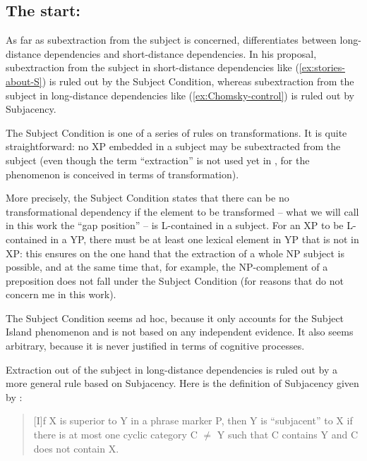 \subsection{The start: \citet{Chomsky.1973}}

As far as subextraction from the subject is concerned, \citet{Chomsky.1973} differentiates between long-distance dependencies and short-distance dependencies. In his proposal, subextraction from the subject in short-distance dependencies like (\ref{ex:stories-about-S}) is ruled out by the Subject Condition, whereas subextraction from the subject in long-distance dependencies like (\ref{ex:Chomsky-control}) is ruled out by Subjacency. 

The Subject Condition is one of a series of rules on transformations. It is quite straightforward: no XP embedded in a subject may be subextracted from the subject (even though the term ``extraction'' is not used yet in \citet{Chomsky.1973}, for the phenomenon is conceived in terms of transformation). 

More precisely, the Subject Condition states that there can be no transformational dependency if the element to be transformed -- what we will call in this work the ``gap position'' -- is L-contained in a subject. For an XP to be L-contained in a YP, there must be at least one lexical element in YP that is not in XP: this ensures on the one hand that the extraction of a whole NP subject is possible, and at the same time that, for example, the NP-complement of a preposition does not fall under the Subject Condition (for reasons that do not concern me in this work).

The Subject Condition seems ad hoc, because it only accounts  for the Subject Island phenomenon and is not based on any independent evidence. It also seems arbitrary, because it is never justified in terms of cognitive processes. 

Extraction out of the subject in long-distance dependencies is ruled out by a more general rule based on Subjacency. Here is the definition of Subjacency given by \citeauthor{Chomsky.1973}: 
\pagebreak
\largerpage

\begin{quote}
 [I]f X is superior to Y in a phrase marker P, then Y is ``subjacent'' to X if there is at most one cyclic category C $\neq$ Y such that C contains Y and C does not contain X. \citep[247]{Chomsky.1973}
\end{quote}


